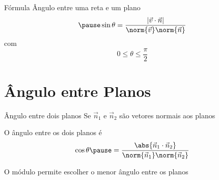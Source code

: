 \documentclass[fleqn,aspectratio=169,12pt]{beamer}
\begin{document}
\begin{frame}{Fórmula}
  Ângulo entre uma reta e um plano
  \[
    \pause
    \sin\theta = \frac{|\vec{v}\cdot\vec{n}|}{\norm{\vec{v}}\norm{\vec{n}}}
  \]
  \pause
  com
  \[
    0 \leq \theta \leq \frac{\pi}{2}
  \]
\end{frame}



\section{Ângulo entre Planos}


\begin{frame}{Ângulo entre dois planos}
  Se
  \(
    \vec{n}_{1}
  \) e
  \(
    \vec{n}_{2}
  \)
  são vetores normais aos planos

  \pause
  \bigskip
  O ângulo entre os dois planos é
  \pause
  \[
    \cos{\theta}
    \pause
    =\frac{\abs{\vec{n}_{1}\cdot\vec{n}_{2}}}
    {
      \norm{\vec{n}_{1}}
      \norm{\vec{n}_{2}}
    }
  \]

  \pause
  \bigskip
  O módulo permite escolher o menor ângulo entre os planos
\end{frame}




%
%

\end{document}
